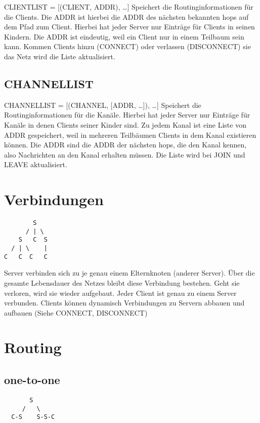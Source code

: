 \documentclass{article}
\begin{document}
CLIENTLIST = [(CLIENT, ADDR), \ldots]
Speichert die Routinginformationen für die Clients. Die ADDR ist hierbei die ADDR des nächsten bekannten hops auf dem Pfad zum Client. Hierbei hat jeder Server nur Einträge für Clients in seinen Kindern. Die ADDR ist eindeutig, weil ein Client nur in einem Teilbaum sein kann. Kommen Clients hinzu (CONNECT) oder verlassen (DISCONNECT) sie das Netz wird die Liste aktualisiert.

\subsection{CHANNELLIST}

CHANNELLIST = [(CHANNEL, [ADDR, \ldots]), \ldots]
Speichert die Routinginformationen für die Kanäle. Hierbei hat jeder Server nur Einträge für Kanäle in denen Clients seiner Kinder sind. Zu jedem Kanal ist eine Liste von ADDR gespeichert, weil in mehreren Teilbäumen Clients in dem Kanal existieren können. Die ADDR sind die ADDR der nächsten hops, die den Kanal kennen, also Nachrichten an den Kanal erhalten müssen. Die Liste wird bei JOIN und LEAVE aktualisiert.


\section{Verbindungen}

\begin{lstlisting}
        S
      / | \
    S   C  S
  / | \    |
C   C  C   C
\end{lstlisting}

Server verbinden sich zu je genau einem Elternknoten (anderer Server). Über die gesamte Lebensdauer des Netzes bleibt diese Verbindung bestehen. Geht sie verloren, wird sie wieder aufgebaut.
Jeder Client ist genau zu einem Server verbunden. Clients können dynamisch Verbindungen zu Servern abbauen und aufbauen (Siehe CONNECT, DISCONNECT)


\section{Routing}

\subsection{one-to-one}

\begin{lstlisting}
       S
     /   \
  C-S    S-S-C
\end{lstlisting}
\end{document}
